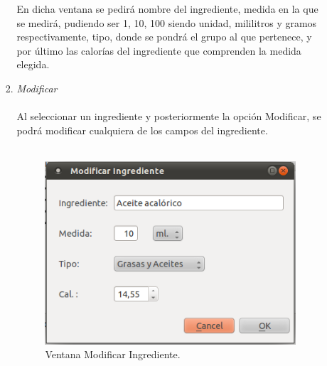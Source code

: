 \begin{enumerate}
\begin{enumerate}
\begin{enumerate}
En dicha ventana se pedirá nombre del ingrediente, medida en la que se medirá, pudiendo ser 1, 10, 100 siendo unidad, mililitros y gramos respectivamente, tipo, donde se pondrá el grupo al que pertenece, y por último las calorías del ingrediente que comprenden la medida elegida.
\item \textit{Modificar}\\\\
Al seleccionar un ingrediente y posteriormente la opción Modificar, se podrá modificar cualquiera de los campos del ingrediente.\\\\
\begin{figure}[H]
  \label{modificar_ingred}
  \begin{center}
    \includegraphics[scale=0.5]{../../Image/ingrediente-modificar.png}
  \end{center}
  \caption{Ventana Modificar Ingrediente.}
\end{figure}


\end{enumerate}
\end{enumerate}
\end{enumerate}
